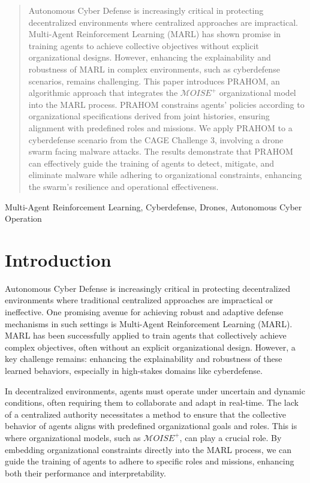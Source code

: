 \documentclass[conference]{IEEEtran}
\begin{document}
\begin{abstract}
    Autonomous Cyber Defense is increasingly critical in protecting decentralized environments where centralized approaches are impractical. Multi-Agent Reinforcement Learning (MARL) has shown promise in training agents to achieve collective objectives without explicit organizational designs. However, enhancing the explainability and robustness of MARL in complex environments, such as cyberdefense scenarios, remains challenging. This paper introduces PRAHOM, an algorithmic approach that integrates the $\mathcal{M}OISE^+$ organizational model into the MARL process. PRAHOM constrains agents' policies according to organizational specifications derived from joint histories, ensuring alignment with predefined roles and missions. We apply PRAHOM to a cyberdefense scenario from the CAGE Challenge 3, involving a drone swarm facing malware attacks. The results demonstrate that PRAHOM can effectively guide the training of agents to detect, mitigate, and eliminate malware while adhering to organizational constraints, enhancing the swarm's resilience and operational effectiveness.
\end{abstract}

\begin{IEEEkeywords}
    Multi-Agent Reinforcement Learning, Cyberdefense, Drones, Autonomous Cyber Operation
\end{IEEEkeywords}


\section{Introduction}
\label{sec:introduction}

Autonomous Cyber Defense is increasingly critical in protecting decentralized environments where traditional centralized approaches are impractical or ineffective. One promising avenue for achieving robust and adaptive defense mechanisms in such settings is Multi-Agent Reinforcement Learning (MARL). MARL has been successfully applied to train agents that collectively achieve complex objectives, often without an explicit organizational design. However, a key challenge remains: enhancing the explainability and robustness of these learned behaviors, especially in high-stakes domains like cyberdefense.

In decentralized environments, agents must operate under uncertain and dynamic conditions, often requiring them to collaborate and adapt in real-time. The lack of a centralized authority necessitates a method to ensure that the collective behavior of agents aligns with predefined organizational goals and roles. This is where organizational models, such as $\mathcal{M}OISE^+$, can play a crucial role. By embedding organizational constraints directly into the MARL process, we can guide the training of agents to adhere to specific roles and missions, enhancing both their performance and interpretability.
\end{document}
